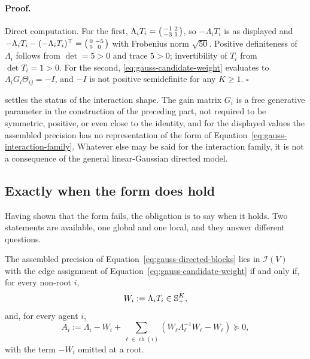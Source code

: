 \paragraph{Proof.}
Direct computation. For the first, $\Lambda_iT_i=\begin{psmallmatrix}-1&2\\-3&1\end{psmallmatrix}$, so $-\Lambda_iT_i$ is as displayed and $-\Lambda_iT_i-(-\Lambda_iT_i)^\top=\begin{psmallmatrix}0&-5\\5&0\end{psmallmatrix}$ with Frobenius norm $\sqrt{50}$. Positive definiteness of $\Lambda_i$ follows from $\det=5>0$ and trace $5>0$; invertibility of $T_i$ from $\det T_i=1>0$. For the second, \eqref{eq:gauss-candidate-weight} evaluates to $\Lambda_iG_i\Theta_{ij}=-I$, and $-I$ is not positive semidefinite for any $K\geq1$. $\square$

 settles the status of the interaction shape. The gain matrix $G_i$ is a free generative parameter in the construction of the preceding part, not required to be symmetric, positive, or even close to the identity, and for the displayed values the assembled precision has no representation of the form of Equation~\eqref{eq:gauss-interaction-family}. Whatever else may be said for the interaction family, it is not a consequence of the general linear-Gaussian directed model.

\subsection{Exactly when the form does hold}

Having shown that the form fails, the obligation is to say when it holds. Two statements are available, one global and one local, and they answer different questions.

The assembled precision of Equation~\eqref{eq:gauss-directed-blocks} lies in $\mathcal I(V)$ with the edge assignment of Equation~\eqref{eq:gauss-candidate-weight} if and only if, for every non-root $i$,
\begin{equation}
W_i:=\Lambda_iT_i\in\mathbb S_{+}^{K},
\label{eq:gauss-global-cond-1}
\end{equation}
and, for every agent $i$,
\begin{equation}
A_i:=\Lambda_i-W_i+\sum_{\ell\in\operatorname{ch}(i)}\left(W_\ell\Lambda_\ell^{-1}W_\ell-W_\ell\right)\succeq0,
\label{eq:gauss-global-cond-2}
\end{equation}
with the term $-W_i$ omitted at a root. 


